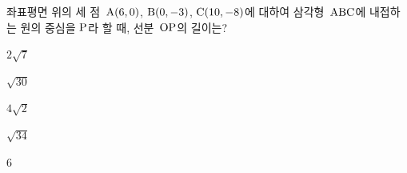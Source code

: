 좌표평면 위의 세 점~$\mathrm{A}(6{,}\mkern3mu\mathopen{}0)$, $\mathrm{B}(0{,}\mkern3mu\mathopen{}-3)$, $\mathrm{C}(10{,}\mkern3mu\mathopen{}-8)$에 대하여 삼각형~$\mathrm{ABC}$에 내접하는 원의 중심을 $\mathrm{P}$라 할 때, 선분~$\mathrm{OP}$의 길이는? 
\begin{choices32}{\rule[-3ex]{0pt}{8ex}$2\sqrt{7}$}{\rule[-3ex]{0pt}{8ex}$\sqrt{30}$}{\rule[-3ex]{0pt}{8ex}$4\sqrt{2}$}{\rule[-3ex]{0pt}{8ex}$\sqrt{34}$}{\rule[-3ex]{0pt}{8ex}$6$}\end{choices32}
